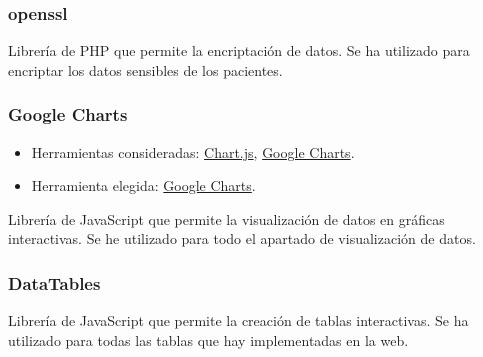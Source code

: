 \subsubsection{openssl}

Librería de PHP que permite la encriptación de datos. Se ha utilizado para encriptar los datos sensibles de los pacientes.

\subsubsection{Google Charts}
\begin{itemize}
    \item Herramientas consideradas: \href{https://www.chartjs.org/}{Chart.js}, \href{https://developers.google.com/chart}{Google Charts}.
	\item Herramienta elegida: \href{https://developers.google.com/chart}{Google Charts}.
\end{itemize}

Librería de JavaScript que permite la visualización de datos en gráficas interactivas. Se he utilizado para todo el apartado de visualización de datos.

\subsubsection{DataTables}

Librería de JavaScript que permite la creación de tablas interactivas. Se ha utilizado para todas las tablas que hay implementadas en la web.





